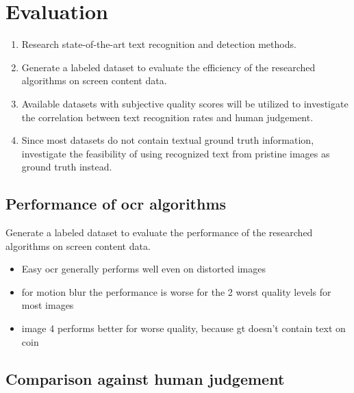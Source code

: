 \chapter{Evaluation}
\label{chap:evaluation}

\begin{enumerate}
\item Research state-of-the-art text recognition and detection methods.

\item Generate a labeled dataset to evaluate the efficiency of the researched algorithms
   on screen content data.

\item Available datasets with subjective quality scores will be utilized to investigate
   the correlation between text recognition rates and human judgement.

\item Since most datasets do not contain textual ground truth information,
   investigate the feasibility of using recognized text from pristine images as ground truth instead.
\end{enumerate}

\section{Performance of ocr algorithms}
\label{sec:ocr_performance}

Generate a labeled dataset to evaluate the performance of the researched algorithms
on screen content data.

\begin{itemize}
\item Easy ocr generally performs well even on distorted images
\item for motion blur the performance is worse for the 2 worst quality levels for most images
\item image 4 performs better for worse quality, because gt doesn't contain text on coin
\end{itemize}


\section{Comparison against human judgement}
\label{sec:comparison_against_human_judgement}

